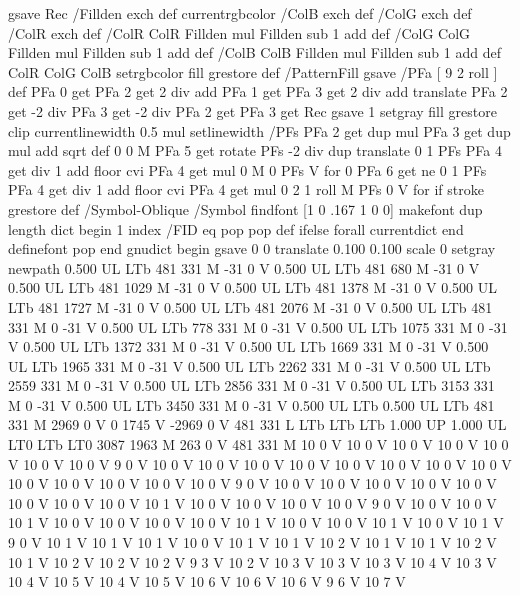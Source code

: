 {{{  gsave Rec
  /Fillden exch def
  currentrgbcolor
  /ColB exch def /ColG exch def /ColR exch def
  /ColR ColR Fillden mul Fillden sub 1 add def
  /ColG ColG Fillden mul Fillden sub 1 add def
  /ColB ColB Fillden mul Fillden sub 1 add def
  ColR ColG ColB setrgbcolor
  fill grestore } def
%
%
/PatternFill { gsave /PFa [ 9 2 roll ] def
    PFa 0 get PFa 2 get 2 div add PFa 1 get PFa 3 get 2 div add translate
    PFa 2 get -2 div PFa 3 get -2 div PFa 2 get PFa 3 get Rec
    gsave 1 setgray fill grestore clip
    currentlinewidth 0.5 mul setlinewidth
    /PFs PFa 2 get dup mul PFa 3 get dup mul add sqrt def
    0 0 M PFa 5 get rotate PFs -2 div dup translate
	0 1 PFs PFa 4 get div 1 add floor cvi
	{ PFa 4 get mul 0 M 0 PFs V } for
    0 PFa 6 get ne {
	0 1 PFs PFa 4 get div 1 add floor cvi
	{ PFa 4 get mul 0 2 1 roll M PFs 0 V } for
    } if
    stroke grestore } def
%
/Symbol-Oblique /Symbol findfont [1 0 .167 1 0 0] makefont
dup length dict begin {1 index /FID eq {pop pop} {def} ifelse} forall
currentdict end definefont pop
end
gnudict begin
gsave
0 0 translate
0.100 0.100 scale
0 setgray
newpath
0.500 UL
LTb
481 331 M
-31 0 V
0.500 UL
LTb
481 680 M
-31 0 V
0.500 UL
LTb
481 1029 M
-31 0 V
0.500 UL
LTb
481 1378 M
-31 0 V
0.500 UL
LTb
481 1727 M
-31 0 V
0.500 UL
LTb
481 2076 M
-31 0 V
0.500 UL
LTb
481 331 M
0 -31 V
0.500 UL
LTb
778 331 M
0 -31 V
0.500 UL
LTb
1075 331 M
0 -31 V
0.500 UL
LTb
1372 331 M
0 -31 V
0.500 UL
LTb
1669 331 M
0 -31 V
0.500 UL
LTb
1965 331 M
0 -31 V
0.500 UL
LTb
2262 331 M
0 -31 V
0.500 UL
LTb
2559 331 M
0 -31 V
0.500 UL
LTb
2856 331 M
0 -31 V
0.500 UL
LTb
3153 331 M
0 -31 V
0.500 UL
LTb
3450 331 M
0 -31 V
0.500 UL
LTb
0.500 UL
LTb
481 331 M
2969 0 V
0 1745 V
-2969 0 V
481 331 L
LTb
LTb
LTb
1.000 UP
1.000 UL
LT0
LTb
LT0
3087 1963 M
263 0 V
481 331 M
10 0 V
10 0 V
10 0 V
10 0 V
10 0 V
10 0 V
10 0 V
9 0 V
10 0 V
10 0 V
10 0 V
10 0 V
10 0 V
10 0 V
10 0 V
10 0 V
10 0 V
10 0 V
10 0 V
10 0 V
10 0 V
9 0 V
10 0 V
10 0 V
10 0 V
10 0 V
10 0 V
10 0 V
10 0 V
10 0 V
10 1 V
10 0 V
10 0 V
10 0 V
10 0 V
9 0 V
10 0 V
10 0 V
10 1 V
10 0 V
10 0 V
10 0 V
10 0 V
10 1 V
10 0 V
10 0 V
10 1 V
10 0 V
10 1 V
9 0 V
10 1 V
10 1 V
10 1 V
10 0 V
10 1 V
10 1 V
10 2 V
10 1 V
10 1 V
10 2 V
10 1 V
10 2 V
10 2 V
10 2 V
9 3 V
10 2 V
10 3 V
10 3 V
10 3 V
10 4 V
10 3 V
10 4 V
10 5 V
10 4 V
10 5 V
10 6 V
10 6 V
10 6 V
9 6 V
10 7 V
}}
